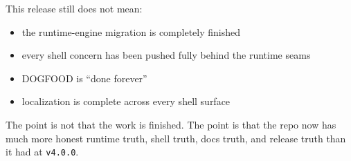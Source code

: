 This release still does not mean:

\begin{itemize}
\tightlist
\item
  the runtime-engine migration is completely finished
\item
  every shell concern has been pushed fully behind the runtime seams
\item
  DOGFOOD is ``done forever''
\item
  localization is complete across every shell surface
\end{itemize}

The point is not that the work is finished. The point is that the repo now has much more honest runtime truth, shell truth, docs truth, and release truth than it had at \texttt{v\allowbreak{}4\allowbreak{}.\allowbreak{}0\allowbreak{}.\allowbreak{}0}.


